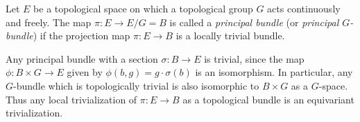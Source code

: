 \documentclass[12pt]{article}
\begin{document}
Let $E$ be a topological space on which a topological group $G$ acts continuously and freely.  The map $\pi:E\to E/G=B$ is called a \emph{principal bundle} (or \emph{principal $G$-bundle}) if the projection
map $\pi:E\to B$ is a locally trivial bundle.

Any principal bundle with a section $\sigma:B\to E$ is trivial, since the map $\phi:B\times G\to E$ given by $\phi(b,g)=g\cdot\sigma(b)$ is an isomorphism. In particular, any $G$-bundle which is topologically trivial is also isomorphic to $B\times G$ as a $G$-space.  Thus any local trivialization of $\pi:E\to B$ as a topological bundle is an equivariant trivialization.
\end{document}
